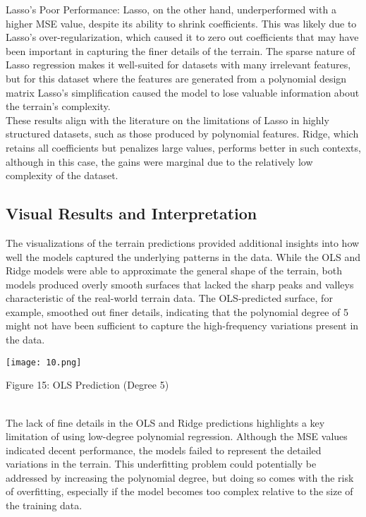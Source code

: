 \documentclass{article}
\begin{document}
\begin{enumerate}
Lasso's Poor Performance: Lasso, on the other hand, underperformed with a higher MSE value, despite its ability to shrink coefficients. This was likely due to Lasso's over-regularization, which caused it to zero out coefficients that may have been important in capturing the finer details of the terrain. The sparse nature of Lasso regression makes it well-suited for datasets with many irrelevant features, but for this dataset where the features are generated from a polynomial design matrix Lasso's simplification caused the model to lose valuable information about the terrain's complexity.\\


These results align with the literature on the limitations of Lasso in highly structured datasets, such as those produced by polynomial features. Ridge, which retains all coefficients but penalizes large values, performs better in such contexts, although in this case, the gains were marginal due to the relatively low complexity of the dataset.

\subsection{Visual Results and Interpretation}

The visualizations of the terrain predictions provided additional insights into how well the models captured the underlying patterns in the data. While the OLS and Ridge models were able to approximate the general shape of the terrain, both models produced overly smooth surfaces that lacked the sharp peaks and valleys characteristic of the real-world terrain data. The OLS-predicted surface, for example, smoothed out finer details, indicating that the polynomial degree of 5 might not have been sufficient to capture the high-frequency variations present in the data.


\texttt{[image: 10.png]}
\caption{Figure 15: OLS Prediction (Degree 5)}
\label{fig:enter-label}\\


The lack of fine details in the OLS and Ridge predictions highlights a key limitation of using low-degree polynomial regression. Although the MSE values indicated decent performance, the models failed to represent the detailed variations in the terrain. This underfitting problem could potentially be addressed by increasing the polynomial degree, but doing so comes with the risk of overfitting, especially if the model becomes too complex relative to the size of the training data.


\end{enumerate}
\end{document}
